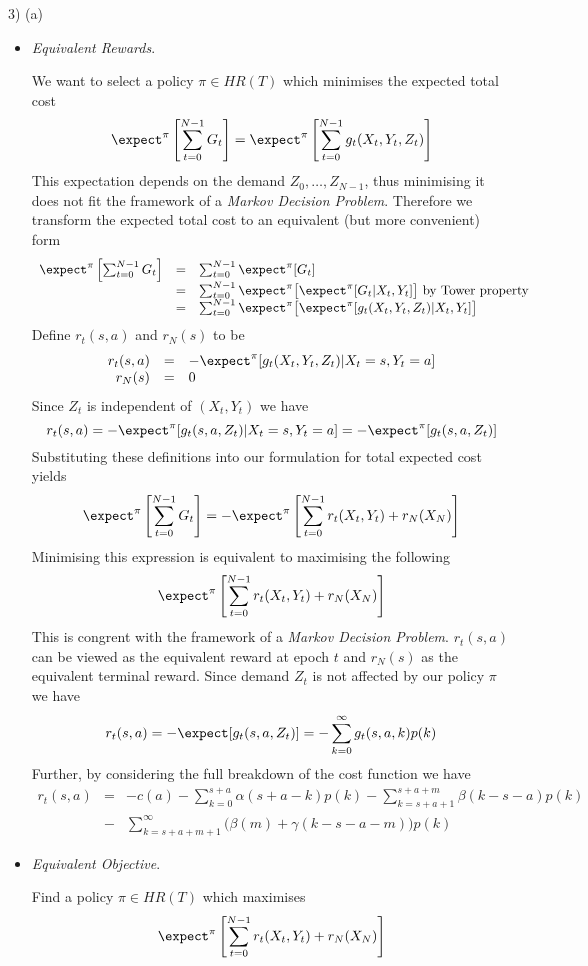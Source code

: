 \documentclass[11pt,a4paper]{article}
\begin{document}
\begin{answer}{3) (a)}
\begin{itemize}
    \item \textit{Equivalent Rewards}.
    \par We want to select a policy $\pi\in HR(T)$ which minimises the expected total cost
    \[ \expect^\pi\left[\sum_{t=0}^{N-1}G_t\right]=\expect^\pi\left[\sum_{t=0}^{N-1}g_t(X_t,Y_t,Z_t)\right] \]
    This expectation depends on the demand $Z_0,\dots,Z_{N-1}$, thus minimising it does not fit the framework of a \textit{Markov Decision Problem}. Therefore we transform the expected total cost to an equivalent (but more convenient) form
    \[\begin{array}{rcl}
      \expect^\pi\left[\sum_{t=0}^{N-1}G_t\right]&=&\sum_{t=0}^{N-1}\expect^\pi[G_t]\\
      &=&\sum_{t=0}^{N-1}\expect^\pi\big[\expect^\pi[G_t|X_t,Y_t]\big]\text{ by Tower property}\\
      &=&\sum_{t=0}^{N-1}\expect^\pi\big[\expect^\pi[g_t(X_t,Y_t,Z_t)|X_t,Y_t]\big]
    \end{array}\]
    Define $r_t(s,a)$ and $r_N(s)$ to be
    \[\begin{array}{rcl}
      r_t(s,a)&=&-\expect^\pi[g_t(X_t,Y_t,Z_t)|X_t=s,Y_t=a]\\
      r_N(s)&=&0
    \end{array}\]
    Since $Z_t$ is independent of $(X_t,Y_t)$ we have
    \[ r_t(s,a)=-\expect^\pi[g_t(s,a,Z_t)|X_t=s,Y_t=a]=-\expect^\pi[g_t(s,a,Z_t)] \]
    Substituting these definitions into our formulation for total expected cost yields
    \[ \expect^\pi\left[\sum_{t=0}^{N-1}G_t\right]=-\expect^\pi\left[\sum_{t=0}^{N-1}r_t(X_t,Y_t)+r_N(X_N)\right] \]
    Minimising this expression is equivalent to maximising the following
    \[ \expect^\pi\left[\sum_{t=0}^{N-1}r_t(X_t,Y_t)+r_N(X_N)\right] \]
    This is congrent with the framework of a \textit{Markov Decision Problem}. $r_t(s,a)$ can be viewed as the equivalent reward at epoch $t$ and $r_N(s)$ as the equivalent terminal reward.
    Since demand $Z_t$ is not affected by our policy $\pi$ we have
    \[ r_t(s,a)=-\expect[g_t(s,a,Z_t)]=-\sum_{k=0}^\infty g_t(s,a,k)p(k) \]
    Further, by considering the full breakdown of the cost function we have
    \[\begin{array}{rcl}
      r_t(s,a)&=&-c(a)-\sum_{k=0}^{s+a}\alpha(s+a-k)p(k)-\sum_{k=s+a+1}^{s+a+m}\beta(k-s-a)p(k)\\
      &-&\sum_{k=s+a+m+1}^\infty\big(\beta(m)+\gamma(k-s-a-m)\big)p(k)
    \end{array}\]

    \item \textit{Equivalent Objective}.
    \par Find a policy $\pi\in HR(T)$ which maximises
    \[ \expect^\pi\left[\sum_{t=0}^{N-1}r_t(X_t,Y_t)+r_N(X_N)\right] \]
  \end{itemize}
\end{answer}
\end{document}
